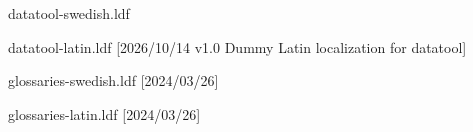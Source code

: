 \begin{filecontents*}{datatool-swedish.ldf}
\end{filecontents*}
\begin{filecontents*}{datatool-latin.ldf}
[2026/10/14 v1.0 Dummy Latin localization for datatool]
\end{filecontents*}
\begin{filecontents*}{glossaries-swedish.ldf}
[2024/03/26]
\renewcommand*{\glossaryname}{Ordlista}
\renewcommand*{\acronymname}{Akronymer}
\renewcommand*{\entryname}{Term}
\renewcommand*{\descriptionname}{Beskrivning}
\end{filecontents*}
\begin{filecontents*}{glossaries-latin.ldf}
[2024/03/26]
\end{filecontents*}
